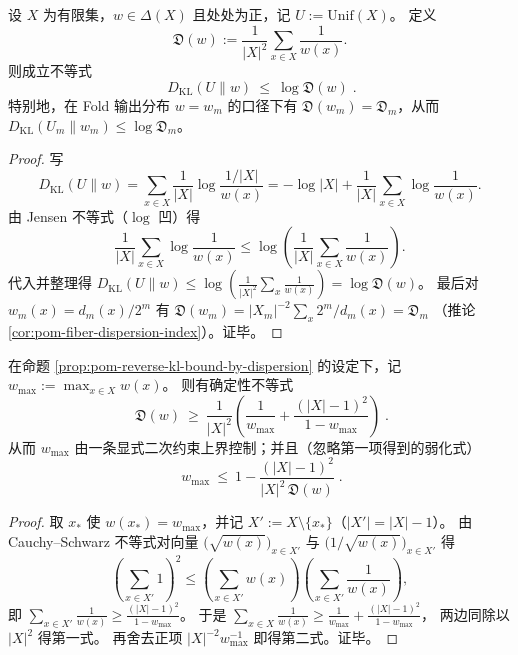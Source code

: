 \begin{proposition}\label{prop:pom-reverse-kl-bound-by-dispersion}
设 \(X\) 为有限集，\(w\in\Delta(X)\) 且处处为正，记 \(U:=\mathrm{Unif}(X)\)。
定义
\[
\mathfrak{D}(w):=\frac{1}{|X|^2}\sum_{x\in X}\frac{1}{w(x)}.
\]
则成立不等式
\[
\boxed{\;
D_{\mathrm{KL}}(U\|w)\ \le\ \log \mathfrak{D}(w)\; }.
\]
特别地，在 Fold 输出分布 \(w=w_m\) 的口径下有 \(\mathfrak{D}(w_m)=\mathfrak{D}_m\)，从而 \(D_{\mathrm{KL}}(U_m\|w_m)\le \log \mathfrak{D}_m\)。
\end{proposition}
\begin{proof}
写
\[
D_{\mathrm{KL}}(U\|w)
=\sum_{x\in X}\frac{1}{|X|}\log\frac{1/|X|}{w(x)}
=-\log|X|+\frac{1}{|X|}\sum_{x\in X}\log\frac{1}{w(x)}.
\]
由 Jensen 不等式（\(\log\) 凹）得
\[
\frac{1}{|X|}\sum_{x\in X}\log\frac{1}{w(x)}
\le
\log\!\left(\frac{1}{|X|}\sum_{x\in X}\frac{1}{w(x)}\right).
\]
代入并整理得
\(
D_{\mathrm{KL}}(U\|w)\le \log\!\left(\frac{1}{|X|^2}\sum_x \frac{1}{w(x)}\right)=\log \mathfrak{D}(w)
\)。
最后对 \(w_m(x)=d_m(x)/2^m\) 有
\(
\mathfrak{D}(w_m)=|X_m|^{-2}\sum_x 2^m/d_m(x)=\mathfrak{D}_m
\)
（推论 \ref{cor:pom-fiber-dispersion-index}）。证毕。
\end{proof}

\begin{corollary}\label{cor:pom-max-mass-upper-bound-by-dispersion}
在命题 \ref{prop:pom-reverse-kl-bound-by-dispersion} 的设定下，记 \(w_{\max}:=\max_{x\in X}w(x)\)。
则有确定性不等式
\[
\boxed{\;
\mathfrak{D}(w)\ \ge\ \frac{1}{|X|^2}\left(\frac{1}{w_{\max}}+\frac{(|X|-1)^2}{1-w_{\max}}\right)\; }.
\]
从而 \(w_{\max}\) 由一条显式二次约束上界控制；并且（忽略第一项得到的弱化式）
\[
\boxed{\;
w_{\max}\ \le\ 1-\frac{(|X|-1)^2}{|X|^2\,\mathfrak{D}(w)}\; }.
\]
\end{corollary}
\begin{proof}
取 \(x_\ast\) 使 \(w(x_\ast)=w_{\max}\)，并记 \(X':=X\setminus\{x_\ast\}\)（\(|X'|=|X|-1\)）。
由 Cauchy--Schwarz 不等式对向量 \(\bigl(\sqrt{w(x)}\bigr)_{x\in X'}\) 与 \(\bigl(1/\sqrt{w(x)}\bigr)_{x\in X'}\) 得
\[
\left(\sum_{x\in X'}1\right)^2
\le
\left(\sum_{x\in X'}w(x)\right)\left(\sum_{x\in X'}\frac{1}{w(x)}\right),
\]
即
\(
\sum_{x\in X'}\frac{1}{w(x)}\ge \frac{(|X|-1)^2}{1-w_{\max}}
\)。
于是
\(
\sum_{x\in X}\frac{1}{w(x)}\ge \frac{1}{w_{\max}}+\frac{(|X|-1)^2}{1-w_{\max}}
\)，
两边同除以 \(|X|^2\) 得第一式。
再舍去正项 \(|X|^{-2}w_{\max}^{-1}\) 即得第二式。证毕。
\end{proof}

